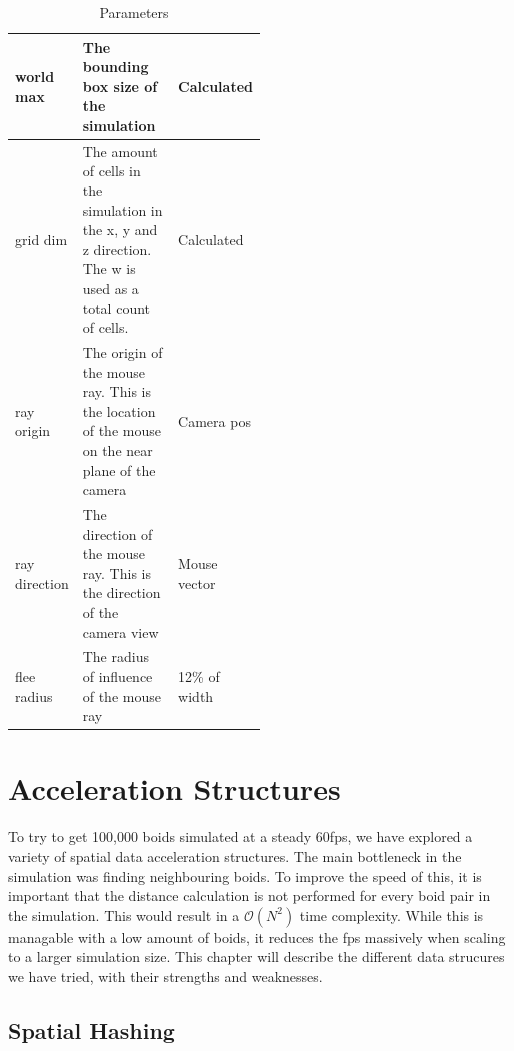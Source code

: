 \documentclass[a4paper, 12pt]{article}
\begin{document}
\begin{table}[H]
\begin{tabular}{lp{0.5\linewidth}l}
        world max           & The bounding box size of the simulation                                                                     & Calculated             \\ \hline
        grid dim            & The amount of cells in the simulation in the x, y and z direction. The w is used as a total count of cells. & Calculated             \\ \hline
        ray origin          & The origin of the mouse ray. This is the location of the mouse on the near plane of the camera              & Camera pos             \\ \hline
        ray direction       & The direction of the mouse ray. This is the direction of the camera view                                    & Mouse vector           \\ \hline
        flee radius         & The radius of influence of the mouse ray                                                                    & 12\% of width          \\ \hline
    \end{tabular}
    \caption{Parameters}\label{tab:parameters}
\end{table}

\section{Acceleration Structures}\label{sec:accel}

To try to get 100,000 boids simulated at a steady 60fps, we have explored a
variety of spatial data acceleration structures. The main bottleneck in the
simulation was finding neighbouring boids. To improve the speed of this, it is
important that the distance calculation is not performed for every boid pair in the simulation.
This would result in a $\mathcal{O}(N^2)$ time complexity. While this is
managable with a low amount of boids, it reduces the fps massively when scaling
to a larger simulation size. This chapter will describe the different data
strucures we have tried, with their strengths and weaknesses.

\subsection{Spatial Hashing}
\label{subsec:spatial_hash}
\end{document}
